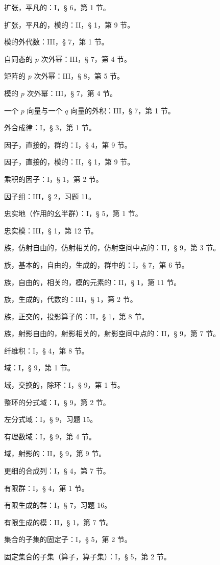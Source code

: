 扩张，平凡的：I，§ 6，第 1 节。

扩张，平凡的，模的：II，§ 1，第 9 节。

模的外代数：III，§ 7，第 1 节。

自同态的 \(p\) 次外幂：III，§ 7，第 4 节。

矩阵的 \(p\) 次外幂：III，§ 8，第 5 节。

模的 \(p\) 次外幂：III，§ 7，第 4 节。

一个 \(p\) 向量与一个 \(q\) 向量的外积：III，§ 7，第 1 节。

外合成律：I，§ 3，第 1 节。

因子，直接的，群的：I，§ 4，第 9 节。

因子，直接的，模的：II，§ 1，第 9 节。

乘积的因子：I，§ 1，第 2 节。

因子组：III，§ 2，习题 11。

忠实地（作用的幺半群）：I，§ 5，第 1 节。

忠实模：III，§ 1，第 12 节。

族，仿射自由的，仿射相关的，仿射空间中点的：II，§ 9，第 3 节。

族，基本的，自由的，生成的，群中的：I，§ 7，第 6 节。

族，自由的，相关的，模的元素的：II，§ 1，第 11 节。

族，生成的，代数的：III，§ 1，第 2 节。

族，正交的，投影算子的：II，§ 1，第 8 节。

族，射影自由的，射影相关的，射影空间中点的：II，§ 9，第 7 节。

纤维积：I，§ 4，第 8 节。

域：I，§ 9，第 1 节。

域，交换的，除环：I，§ 9，第 1 节。

整环的分式域：I，§ 9，第 2 节。

左分式域：I，§ 9，习题 15。

有理数域：I，§ 9，第 4 节。

域，射影的：II，§ 9，第 9 节。

更细的合成列：I，§ 4，第 7 节。

有限群：I，§ 4，第 1 节。

有限生成的群：I，§ 7，习题 16。

有限生成的模：II，§ 1，第 7 节。

集合的子集的固定子：I，§ 5，第 2 节。

固定集合的子集（算子，算子集）：I，§ 5，第 2 节。

